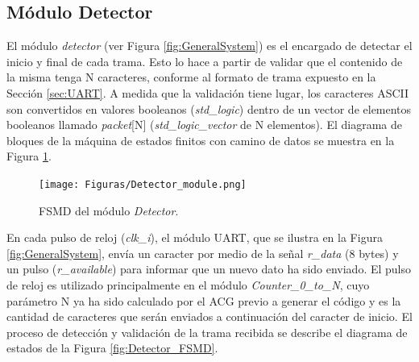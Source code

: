 \subsection{Módulo Detector}
	\label{sec:detector}
	
	El módulo \textit{detector} (ver Figura \ref{fig:GeneralSystem}) es el encargado de detectar el inicio y final de cada trama. Esto lo hace a partir de validar que el contenido de la misma tenga N caracteres, conforme al formato de trama expuesto en la Sección \ref{sec:UART}. A medida que la validación tiene lugar, los caracteres ASCII son convertidos en valores booleanos (\textit{std\_logic}) dentro de un vector de elementos booleanos llamado \textit{packet}[N] (\textit{std\_logic\_vector} de N elementos). El diagrama de bloques de la máquina de estados finitos con camino de datos se muestra en la Figura \ref{fig:Detector_module}.
	
	\begin{figure}[H]
		\centering
		\texttt{[image: Figuras/Detector\_module.png]}
		\centering\caption{FSMD del módulo \textit{Detector}.}
		\label{fig:Detector_module}
	\end{figure}
	
	En cada pulso de reloj (\textit{clk\_i}), el módulo UART, que se ilustra en la Figura \ref{fig:GeneralSystem}, envía un caracter por medio de la señal \textit{r\_data} (8 bytes) y un pulso (\textit{r\_available}) para informar que un nuevo dato ha sido enviado. El pulso de reloj es utilizado principalmente en el módulo \textit{Counter\_0\_to\_N}, cuyo parámetro N ya ha sido calculado por el ACG previo a generar el código y es la cantidad de caracteres que serán enviados a continuación del caracter de inicio. El proceso de detección y validación de la trama recibida se describe el diagrama de estados de la Figura \ref{fig:Detector_FSMD}.
	
